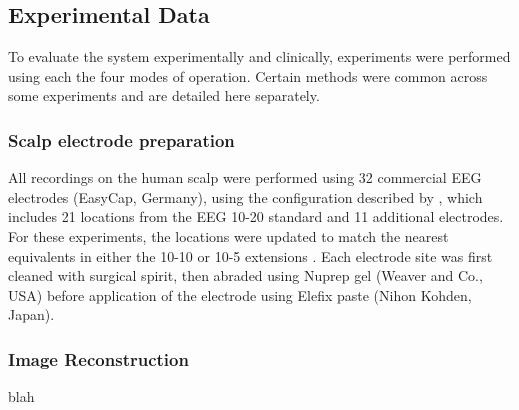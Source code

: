 \subsection{Experimental Data}

To evaluate the system experimentally and clinically, experiments were performed using each the four modes of operation. Certain methods were common across some experiments and are detailed here separately. 

\subsubsection{Scalp electrode preparation}
All recordings on the human scalp were performed using 32 commercial EEG electrodes (EasyCap, Germany), using the configuration described by \citet{tidswell2001three}, which includes 21 locations from the EEG 10-20 standard \cite{Jasper1958} and 11 additional electrodes. For these experiments, the locations were updated to match the nearest equivalents in either the 10-10 or 10-5 extensions \cite{Oostenveld2001}. Each electrode site was first cleaned with surgical spirit, then abraded using Nuprep gel (Weaver and Co., USA) before application of the electrode using Elefix paste (Nihon Kohden, Japan). 

\subsubsection{Image Reconstruction}
blah











